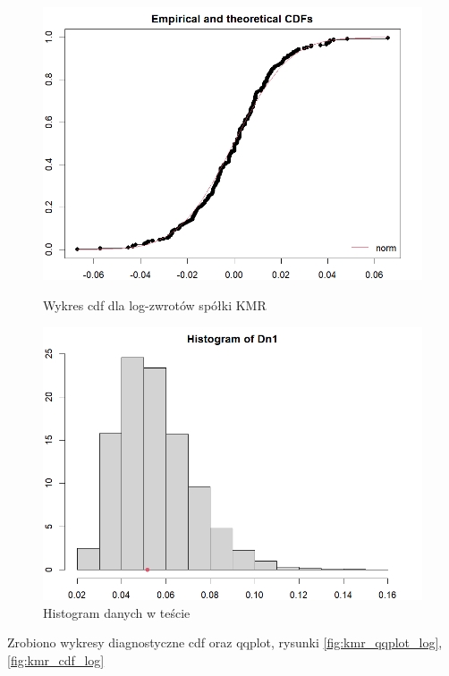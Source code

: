 \documentclass[a4paper,11pt]{article}
\begin{document}
\begin{figure}[!htb]
    \begin{minipage}{0.45\textwidth}
        \centering
        \includegraphics[width=\linewidth]{images/kmr_cdf_log.png}
        \caption{Wykres cdf dla log-zwrotów spółki KMR}
        \label{fig:kmr_cdf_log}
    \end{minipage}\hspace{0.05\textwidth}%
    \begin{minipage}{0.45\textwidth}
        \centering
        \includegraphics[width=\linewidth]{images/kmr_histMC.png}
        \caption{Histogram danych w teście}
        \label{fig:kmr_histMC}
    \end{minipage}
\end{figure}

Zrobiono wykresy diagnostyczne cdf oraz qqplot, rysunki \ref{fig:kmr_qqplot_log}, \ref{fig:kmr_cdf_log}
\end{document}

